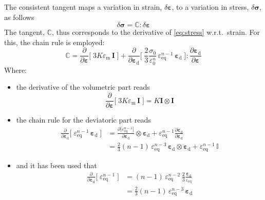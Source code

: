 \documentclass[namecite, fleqn]{goose-article}
\begin{document}
The consistent tangent maps a variation in strain, $\delta \bm{\varepsilon}$,
to a variation in stress, $\delta \bm{\sigma}$, as follows
\begin{equation}
  \delta \bm{\sigma} = \mathbb{C} : \delta \bm{\varepsilon}
\end{equation}
The tangent, $\mathbb{C}$, thus corresponds to the derivative of \cref{eq:stress} w.r.t.\ strain.
For this, the chain rule is employed:
\begin{equation}
    \mathbb{C}
    = \frac{\partial}{\partial \bm{\varepsilon}}
    \bigg[\;
        3 K \varepsilon_\mathrm{m} \, \bm{I}
    \;\bigg]
    + \frac{\partial}{\partial \bm{\varepsilon}_\mathrm{d}}
    \bigg[\;
        \frac{2}{3} \frac{\sigma_0}{\varepsilon_0^n} \,
        \varepsilon_\mathrm{eq}^{n-1} \, \bm{\varepsilon}_\mathrm{d}
    \;\bigg]
    : \frac{\partial \bm{\varepsilon}_\mathrm{d}}{\partial \bm{\varepsilon}}
\end{equation}
Where:
\begin{itemize}

    \item the derivative of the volumetric part reads
    \begin{equation}
        \frac{\partial}{\partial \bm{\varepsilon}}
        \bigg[\;
            3 K \varepsilon_\mathrm{m} \, \bm{I}
        \;\bigg]
        = K \bm{I} \otimes \bm{I}
    \end{equation}

    \item the chain rule for the deviatoric part reads
    \begin{align}
        \frac{\partial}{\partial \bm{\varepsilon}_\mathrm{d}}
        \bigg[\;
            \varepsilon_\mathrm{eq}^{n-1} \, \bm{\varepsilon}_\mathrm{d}
        \;\bigg]
        &=
        \frac{
            \partial \big[ \varepsilon_\mathrm{eq}^{n-1} \big]
        }{
            \partial \bm{\varepsilon}_\mathrm{d}
        } \otimes \bm{\varepsilon}_\mathrm{d}
        + \varepsilon_\mathrm{eq}^{n-1}
        \frac{
            \partial \bm{\varepsilon}_\mathrm{d}
        }{
            \partial \bm{\varepsilon}_\mathrm{d}
        }
        \\
        &=
        \tfrac{2}{3} (n-1) \, \varepsilon_\mathrm{eq}^{n-3} \,
        \bm{\varepsilon}_\mathrm{d} \otimes \bm{\varepsilon}_\mathrm{d}
        + \varepsilon_\mathrm{eq}^{n-1} \, \mathbb{I}
    \end{align}

    \item and it has been used that
    \begin{align}
        \frac{\partial}{\partial \bm{\varepsilon}_\mathrm{d}}
        \bigg[\;
            \varepsilon_\mathrm{eq}^{n-1}
        \;\bigg]
        &= (n-1)\, \varepsilon_\mathrm{eq}^{n-2} \,
        \frac{2}{3} \frac{\bm{\varepsilon}_\mathrm{d}}{\varepsilon_\mathrm{eq}}
        \\
        &= \tfrac{2}{3} (n-1) \,
        \varepsilon_\mathrm{eq}^{n-3} \, \bm{\varepsilon}_\mathrm{d}
    \end{align}

\end{itemize}
\end{document}
